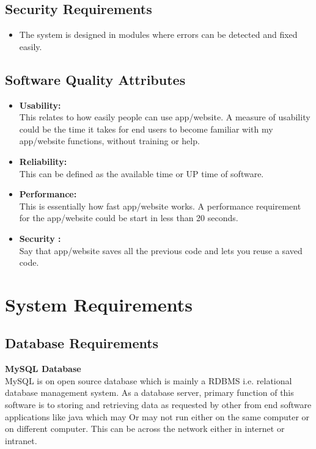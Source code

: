 \documentclass[oneside,a4paper,12pt]{report}
\begin{document}
\subsection{Security Requirements}
\begin{itemize}
\item The system is designed in modules where errors can be detected and fixed easily.
\end{itemize}

\subsection{Software Quality Attributes}
\begin{itemize}
\item \textbf{Usability: }\\
\hspace*{0.5cm} This relates to how easily people can use app/website. A measure of usability could be the time it takes for end users to become familiar with my app/website functions, without training or help.
\item \textbf{Reliability:}\\
\hspace*{0.5cm} This can be defined as the available time or UP time of software.
\item \textbf{Performance: }\\
\hspace*{0.5cm} This is essentially how fast app/website works. A performance requirement for the app/website could be start in less than 20 seconds.
\item \textbf{Security :}\\
\hspace*{0.5cm} Say that app/website saves all the previous code and lets you reuse a saved code.
\end{itemize}

\section{System Requirements}
\subsection{Database Requirements}
\textbf{MySQL Database}\\
\hspace*{0.5cm} MySQL is on open source database which is mainly a RDBMS i.e. relational database management system. As a database server, primary function of this software is to storing and retrieving data as requested by other from end software applications like java which may  Or may not run either on the same computer or on different computer. This can be across the network either in internet or intranet.
\end{document}
